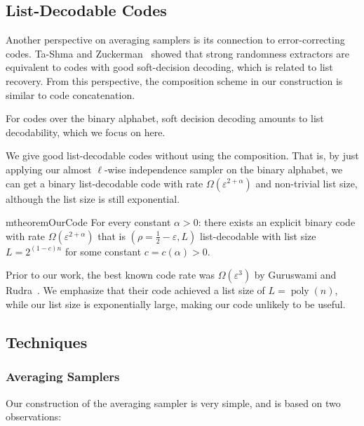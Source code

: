 \documentclass[11pt,letterpaper]{article}
\DeclareMathOperator*{\poly}{poly}
\newcommand{\eps}{\varepsilon}
\newcommand{\1}{\mathbbm{1}}
\begin{document}
\subsection{List-Decodable Codes}

Another perspective on averaging samplers is its connection to error-correcting codes. 
Ta-Shma and Zuckerman~\cite{ExtractorCodes} showed that strong randomness extractors are equivalent to codes with good soft-decision decoding, which is related to list recovery.
From this perspective, the composition scheme in our construction is similar to code concatenation. 

For codes over the binary alphabet, soft decision decoding amounts to list decodability, which we focus on here.

We give good list-decodable codes without using the composition. That is, by just applying our almost $\ell$-wise independence sampler on the binary alphabet, we can get a binary list-decodable code with rate $\Omega(\eps^{2 + \alpha})$ and non-trivial list size, although the list size is still exponential.

\begin{restatable}{mtheorem}{OurCode}
    \label{thm:our_code}
    For every constant $\alpha > 0$: there exists an explicit binary code with rate $\Omega(\eps^{2 + \alpha})$ that is $(\rho = \frac{1}{2} - \eps, L)$ list-decodable with list size $L = 2^{(1 - c)n}$ for some constant $c = c(\alpha) > 0$.    
\end{restatable}

Prior to our work, the best known code rate was $\Omega(\eps^3)$ by Guruswami and Rudra~\cite{GR08}. We emphasize that their code achieved a list size of $L = \poly(n)$, while our list size is exponentially large, making our code unlikely to be useful.



\subsection{Techniques}
\subsubsection{Averaging Samplers}
Our construction of the averaging sampler is very simple, and is based on two observations:
\end{document}
